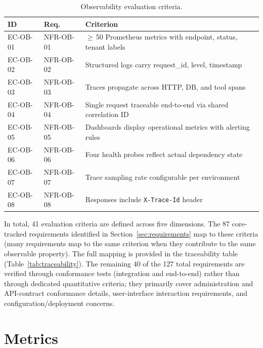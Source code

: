 \documentclass[a4paper,noexaminfo]{sapthesis}
\begin{document}
\begin{table}[ht]
\centering
\caption{Observability evaluation criteria.}
\label{tab:ec-ob}
\small
\begin{tabularx}{\textwidth}{@{}l l X@{}}
    \hline
    \textbf{ID} & \textbf{Req.} & \textbf{Criterion} \\
    \hline
    EC-OB-01 & NFR-OB-01 & $\geq$\,50 Prometheus metrics with endpoint,
        status, tenant labels \\
    EC-OB-02 & NFR-OB-02 & Structured logs carry request\_id, level,
        timestamp \\
    EC-OB-03 & NFR-OB-03 & Traces propagate across HTTP, DB, and tool
        spans \\
    EC-OB-04 & NFR-OB-04 & Single request traceable end-to-end via
        shared correlation ID \\
    EC-OB-05 & NFR-OB-05 & Dashboards display operational metrics with
        alerting rules \\
    EC-OB-06 & NFR-OB-06 & Four health probes reflect actual dependency
        state \\
    EC-OB-07 & NFR-OB-07 & Trace sampling rate configurable per
        environment \\
    EC-OB-08 & NFR-OB-08 & Responses include \texttt{X-Trace-Id}
        header \\
    \hline
\end{tabularx}
\end{table}

\medskip
In total, 41 evaluation criteria are defined across five dimensions.
The 87 core-tracked requirements identified in
Section~\ref{sec:requirements} map to these criteria (many requirements
map to the same criterion when they contribute to the same observable
property).  The full mapping is provided in the traceability table
(Table~\ref{tab:traceability}).  The remaining 40 of the 127 total requirements are verified through
conformance tests (integration and end-to-end) rather than through
dedicated quantitative criteria; they primarily cover administration and
API-contract conformance details, user-interface interaction
requirements, and configuration/deployment concerns.


\section{Metrics}
\label{sec:metrics}
\end{document}
